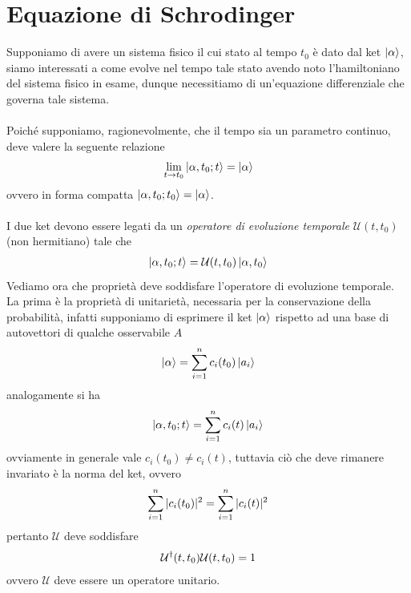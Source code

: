 \documentclass{article}
\begin{document}
\section{Equazione di Schrodinger}
Supponiamo di avere un sistema fisico il cui stato al tempo $t_0$ è dato dal ket $\ket{\alpha}$, siamo interessati a come evolve nel tempo tale stato avendo noto l'hamiltoniano del sistema fisico in esame, dunque necessitiamo di un'equazione differenziale che governa tale sistema. \\ \\
Poiché supponiamo, ragionevolmente, che il tempo sia un parametro continuo, deve valere la seguente relazione
\begin{gather}
    \lim_{t \rightarrow t_0} \ket{\alpha, t_0; t} = \ket{\alpha} \notag 
\end{gather}
ovvero in forma compatta $\ket{\alpha, t_0; t_0} = \ket{\alpha}$. \\ \\
I due ket devono essere legati da un \textit{operatore di evoluzione temporale} $\mathcal{U}(t, t_0)$ (non hermitiano) tale che
\begin{gather}
    \ket{\alpha, t_0; t} = \mathcal{U}(t, t_0)\ket{\alpha, t_0} \notag
\end{gather}
Vediamo ora che proprietà deve soddisfare l'operatore di evoluzione temporale. La prima è la proprietà di unitarietà, necessaria per la conservazione della probabilità, infatti supponiamo di esprimere il ket $\ket{\alpha}$ rispetto ad una base di autovettori di qualche osservabile $A$
\begin{gather}
    \ket{\alpha} = \sum_{i = 1}^n c_i(t_0) \ket{a_i} \notag
\end{gather}
analogamente si ha
\begin{gather}
    \ket{\alpha, t_0; t} = \sum_{i = 1}^n c_i(t) \ket{a_i} \notag
\end{gather}
ovviamente in generale vale $c_i(t_0) \neq c_i(t)$, tuttavia ciò che deve rimanere invariato è la norma del ket, ovvero
\begin{gather}
    \sum_{i = 1}^n |c_i(t_0)|^2 = \sum_{i = 1}^n |c_i(t)|^2 \notag
\end{gather}
pertanto $\mathcal{U}$ deve soddisfare
\begin{gather}
    \mathcal{U}^\dagger (t, t_0) \mathcal{U}(t, t_0) = 1 \notag
\end{gather}
ovvero $\mathcal{U}$ deve essere un operatore unitario. \\ \\
\end{document}
